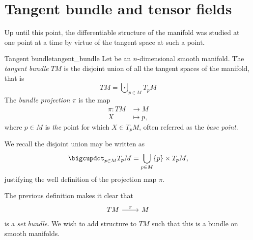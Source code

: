 \section{Tangent bundle and tensor fields}
Up until this point, the differentiable structure of the manifold was studied at one point at a time by virtue of the tangent space at such a point.

\begin{definition}{Tangent bundle}{tangent_bundle}
    Let  be an \(n\)-dimensional smooth manifold. The \emph{tangent bundle }\(TM\) is the disjoint union of all the tangent spaces of the manifold, that is
    \begin{equation*}
        TM = \bigcupdot_{p \in M} T_pM
    \end{equation*}
    The \emph{bundle projection} \(\pi\) is the map
    \begin{align*}
        \pi : TM &\to M\\
               X &\mapsto p,
    \end{align*}
    where \(p \in M\) is \emph{the} point for which \(X \in T_pM\), often referred as the \emph{base point}.
\end{definition}
\begin{remark}
    We recall the disjoint union may be written as
    \begin{equation*}
        \bigcupdot_{p\in M} T_pM = \bigcup_{p \in M} \set*{p} \times T_pM,
    \end{equation*}
    justifying the well definition of the projection map \(\pi\).
\end{remark}

The previous definition makes it clear that
\begin{equation*}
    \begin{tikzcd}[column sep = normal, row sep = large]
        TM \arrow{r}{\pi} & M
    \end{tikzcd}
\end{equation*}
is a \emph{set bundle}. We wish to add structure to \(TM\) such that this is a bundle on smooth manifolds.


